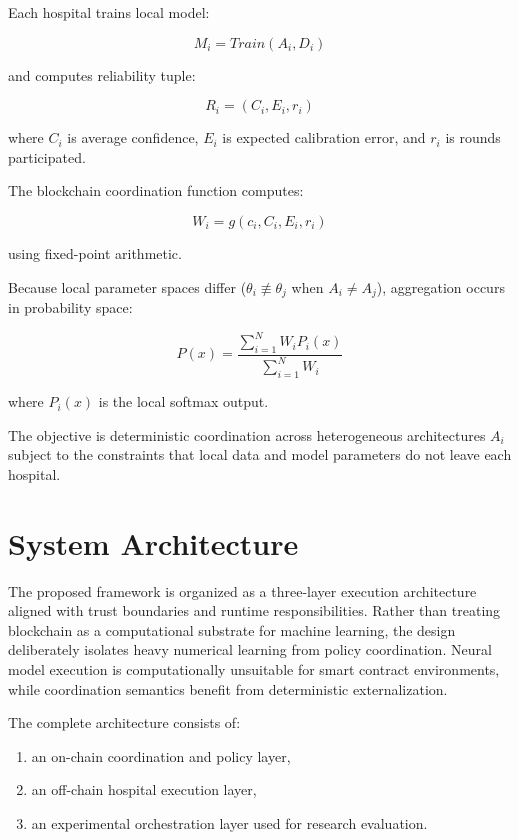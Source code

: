 \documentclass[conference]{IEEEtran}
\begin{document}
Each hospital trains local model:

\begin{equation}
M_i = Train(A_i,D_i)
\end{equation}

and computes reliability tuple:

\begin{equation}
R_i = (C_i,E_i,r_i)
\end{equation}

where $C_i$ is average confidence, $E_i$ is expected calibration error, and $r_i$ is rounds participated.

The blockchain coordination function computes:

\begin{equation}
W_i = g(c_i,C_i,E_i,r_i)
\end{equation}

using fixed-point arithmetic.

Because local parameter spaces differ ($\theta_i \not\equiv \theta_j$ when $A_i \neq A_j$), aggregation occurs in probability space:

\begin{equation}
P(x)=\frac{\sum_{i=1}^{N}W_iP_i(x)}{\sum_{i=1}^{N}W_i}
\end{equation}

where $P_i(x)$ is the local softmax output.

The objective is deterministic coordination across heterogeneous architectures $A_i$ subject to the constraints that local data and model parameters do not leave each hospital.

\section{System Architecture}

The proposed framework is organized as a three-layer execution architecture aligned with trust boundaries and runtime responsibilities. Rather than treating blockchain as a computational substrate for machine learning, the design deliberately isolates heavy numerical learning from policy coordination. Neural model execution is computationally unsuitable for smart contract environments, while coordination semantics benefit from deterministic externalization.

The complete architecture consists of:

\begin{enumerate}
\item an on-chain coordination and policy layer,
\item an off-chain hospital execution layer,
\item an experimental orchestration layer used for research evaluation.
\end{enumerate}
\end{document}

